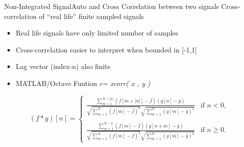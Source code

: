 \documentclass{beamer}
\begin{document}
\begin{frame}{Non-Integrated Signal}{Auto and Cross Correlation between two signals}
Cross-correlation of “real life” finite sampled signals
\begin{itemize}
\item Real life signals have only limited number of samples
\item Cross-correlation easier to interpret when bounded in [-1,1]
\item Lag vector (index-n) also finite
\item MATLAB/Octave Funtion \emph{r= xcorr( x , y )}
\end{itemize}

$$(f \ast g) [n]=  \begin{cases}
      \frac{\sum_{m=1}^{N-|n|} (f[m +|n|] - \bar{f} ) (g[n] - \bar{g} ) } {\sqrt{\sum_{m=1}^{N} (f[m] - \bar{f})^2}\sqrt{\sum_{m=1}^{N} (g[m] - \bar{g})^2}}& \text{if } n < 0,\\
\\
      \frac{\sum_{m=1}^{N-n} (f[m] - \bar{f} ) (g[n+m] - \bar{g} )} {\sqrt{\sum_{m=1}^{N} (f[m] - \bar{f})^2}\sqrt{\sum_{m=1}^{N} (g[m] - \bar{g})^2}} & \text{if } n \ge 0.
    \end{cases}$$

\end{frame}
\end{document}
